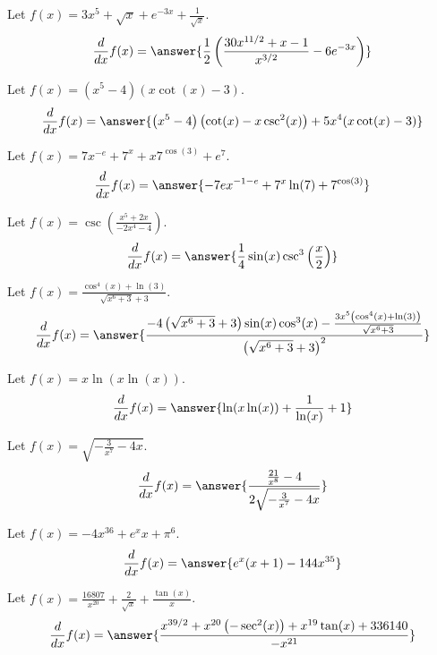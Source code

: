 \documentclass{ximera}
\begin{document}
\begin{shuffle}
\begin{exercise}
\begin{exercise}
Let $f(x)=3 x^5+\sqrt{x}+e^{-3 x}+\frac{1}{\sqrt{x}}$.
\[
\ddx f(x) = \answer{\frac{1}{2} \left(\frac{30 x^{11/2}+x-1}{x^{3/2}}-6 e^{-3 x}\right)}
\]
\end{exercise}

\begin{exercise}
Let $f(x)=\left(x^5-4\right) (x \cot (x)-3)$.
\[
\ddx f(x) = \answer{\left(x^5-4\right) \left(\cot (x)-x \csc ^2(x)\right)+5 x^4 (x \cot (x)-3)}
\]
\end{exercise}

\begin{exercise}
Let $f(x)=7 x^{-e}+7^x+x 7^{\cos (3)}+e^7$.
\[
\ddx f(x) = \answer{-7 e x^{-1-e}+7^x \ln (7)+7^{\cos (3)}}
\]
\end{exercise}

\begin{exercise}
Let $f(x)=\csc \left(\frac{x^5+2 x}{-2 x^4-4}\right)$.
\[
\ddx f(x) = \answer{\frac{1}{4} \sin (x) \csc ^3\left(\frac{x}{2}\right)}
\]
\end{exercise}

\begin{exercise}
Let $f(x)=\frac{\cos ^4(x)+\ln (3)}{\sqrt{x^6+3}+3}$.
\[
\ddx f(x) = \answer{\frac{-4 \left(\sqrt{x^6+3}+3\right) \sin (x) \cos ^3(x)-\frac{3 x^5 \left(\cos ^4(x)+\ln (3)\right)}{\sqrt{x^6+3}}}{\left(\sqrt{x^6+3}+3\right)^2}}
\]
\end{exercise}

\begin{exercise}
Let $f(x)=x \ln (x \ln (x))$.
\[
\ddx f(x) = \answer{\ln (x \ln (x))+\frac{1}{\ln (x)}+1}
\]
\end{exercise}

\begin{exercise}
Let $f(x)=\sqrt{-\frac{3}{x^7}-4 x}$.
\[
\ddx f(x) = \answer{\frac{\frac{21}{x^8}-4}{2 \sqrt{-\frac{3}{x^7}-4 x}}}
\]
\end{exercise}

\begin{exercise}
Let $f(x)=-4 x^{36}+e^x x+\pi ^6$.
\[
\ddx f(x) = \answer{e^x (x+1)-144 x^{35}}
\]
\end{exercise}

\begin{exercise}
Let $f(x)=\frac{16807}{x^{20}}+\frac{2}{\sqrt{x}}+\frac{\tan (x)}{x}$.
\[
\ddx f(x) = \answer{\frac{x^{39/2}+x^{20} \left(-\sec ^2(x)\right)+x^{19} \tan (x)+336140}{-x^{21}}}
\]
\end{exercise}


\end{exercise}
\end{shuffle}
\end{document}
